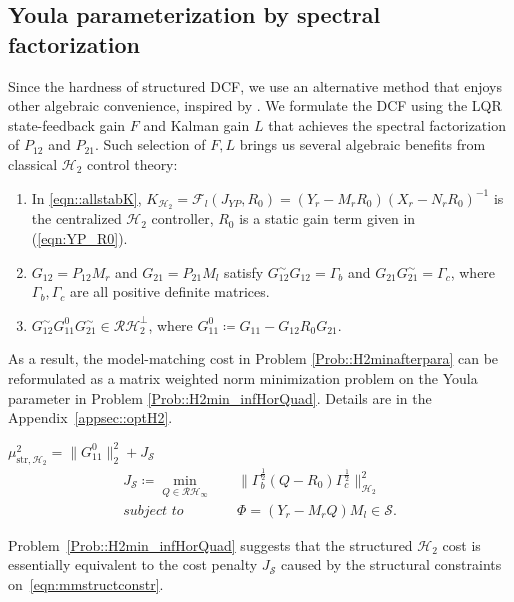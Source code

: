 \subsection{Youla parameterization by spectral factorization}
Since the hardness of structured DCF, we use an alternative method that enjoys other algebraic convenience, inspired by \cite{Lamperski2015H2}. We formulate the DCF using the LQR state-feedback gain \(F\) and Kalman gain \(L\) that achieves the spectral factorization of \(P_{12}\) and \(P_{21}\). Such selection of \(F,L\) brings us several algebraic benefits from classical \(\mathcal{H}_2\) control theory:
\begin{enumerate}
    \item In \eqref{eqn::allstabK}, \(K_{\mathcal{H}_2}= \mathcal{F}_l(J_{YP}, R_0)= (Y_r - M_r R_0) (X_r - N_r R_0)^{-1}\) is the centralized \(\mathcal{H}_2\) controller, \(R_0\) is a static gain term given in (\ref{eqn:YP_R0}).
    \item \(G_{12} = P_{12} M_r\) and \(G_{21} = P_{21} M_l\) satisfy \(G_{12}^{\sim} G_{12} =\Gamma_b\) and \(G_{21} G_{21}^{\sim} =\Gamma_c\), where \(\Gamma_b ,\Gamma_c\) are all positive definite matrices.
    \item \(G_{12}^\sim G_{11}^0 G_{21}^\sim \in \mathcal{RH}_2^\perp\), where \(G_{11}^0 \coloneqq G_{11} -G_{12} R_0 G_{21}\).
\end{enumerate}
As a result, the model-matching cost in Problem \ref{Prob::H2minafterpara} can be reformulated as a matrix weighted norm minimization problem on the Youla parameter in Problem \ref{Prob::H2min_infHorQuad}. Details are in the Appendix~\ref{appsec::optH2}.
\begin{opt}\label{Prob::H2min_infHorQuad}
\(\mu_{\mathrm{str}, \mathcal{H}_2}^2 = \|G_{11}^0\|_2^2 + J_\mathcal{S}\)
\begin{subequations}
\begin{align}
    J_\mathcal{S} \coloneqq \underset{Q\in\mathcal{RH}_\infty}{\min} \quad & \|\Gamma_b^{\frac{1}{2}}(Q-R_0) \Gamma_c^{\frac{1}{2}}\|_{\mathcal{H}_2}^2 \\
    \textit{subject to} \quad & \Phi = (Y_r - M_r Q) M_l\in \mathcal{S}.
\end{align}
\end{subequations}
\end{opt}
Problem~\ref{Prob::H2min_infHorQuad} suggests that the structured \(\mathcal{H}_2\) cost is essentially equivalent to the cost penalty \(J_\mathcal{S}\) caused by the structural constraints on~\eqref{eqn:mmstructconstr}.










